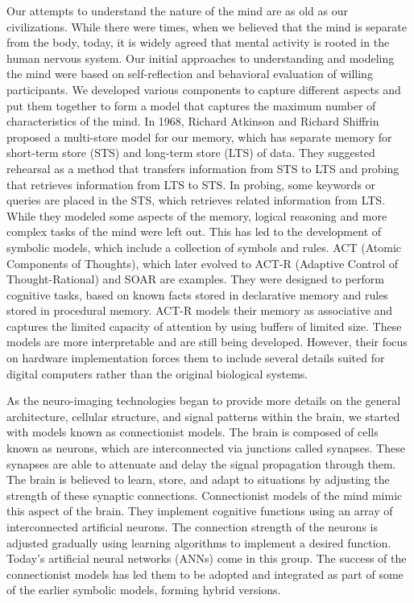 \documentclass[reprint,amsmath,amssymb,apr,aip,onecolumn, 11pt]{revtex4-1}
\begin{document}
	
		
	Our attempts to understand the nature of the mind are as old as our civilizations. While there were times, when we believed that the mind is separate from the body, today, it is widely agreed that mental activity is rooted in the human nervous system. Our initial approaches to understanding and modeling the mind were based on self-reflection and behavioral evaluation of willing participants. We developed various components to capture different aspects and put them together to form a model that captures the maximum number of characteristics of the mind.  In 1968, Richard Atkinson and Richard Shiffrin proposed a multi-store model for our memory, which has separate memory for short-term store (STS) and long-term store (LTS) of data\cite{ATKINSON1968, Atkinson_1971}. They suggested rehearsal as a method that transfers information from STS to LTS and probing that retrieves information from LTS to STS. In probing, some keywords or queries are placed in the STS, which retrieves related information from LTS. While they modeled some aspects of the memory,  logical reasoning and more complex tasks of the mind were left out. This has led to the development of symbolic models, which include a collection of symbols and rules. ACT (Atomic Components of Thoughts), which later evolved to ACT-R (Adaptive Control of Thought-Rational)\cite{Anderson_1974, Anderson_1998}  and SOAR\cite{Newell_1990} are examples. They were designed to perform cognitive tasks, based on known facts stored in declarative memory and rules stored in procedural memory. ACT-R models their memory as associative and captures the limited capacity of attention by using buffers of limited size.  These models are more interpretable and are still being developed. However, their focus on hardware implementation forces them to include several details suited for digital computers rather than the original biological systems. 
	
	As the neuro-imaging technologies began to provide more details on the general architecture,  cellular structure, and signal patterns within the brain, we started with models known as connectionist models.  The brain is composed of cells known as neurons, which are interconnected via junctions called synapses. These synapses are able to attenuate and delay the signal propagation through them. The brain is believed to learn, store, and adapt to situations by adjusting the strength of these synaptic connections. Connectionist models of the mind mimic this aspect of the brain. They implement cognitive functions using an array of interconnected artificial neurons. The connection strength of the neurons is adjusted gradually using learning algorithms to implement a desired function. Today's artificial neural networks (ANNs) come in this group. The success of the connectionist models has led them to be adopted and integrated as part of some of the earlier symbolic models, forming hybrid versions.
	
\end{document}
